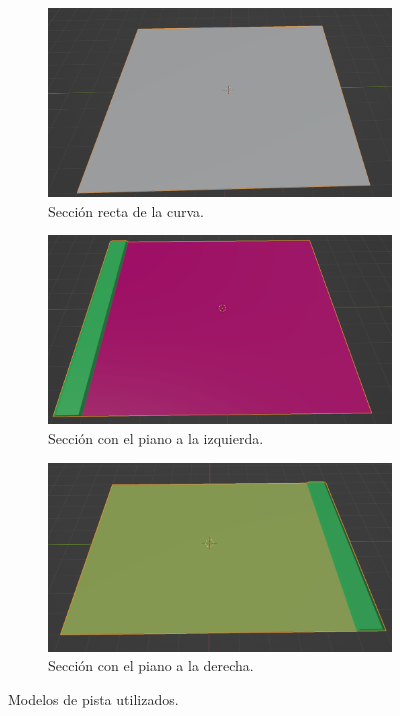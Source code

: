 \begin{figure}[H]
    \centering
    \begin{subfigure}[t]{0.48\textwidth}
        \centering
        \includegraphics[width=\textwidth]{imagenes/pista/curva-recta.png}
        \caption{Sección recta de la curva.}
        \label{fig:curvarecta}
    \end{subfigure}
    \hfill
    \begin{subfigure}[t]{0.48\textwidth}
        \centering
        \includegraphics[width=\textwidth]{imagenes/pista/curva.png}
        \caption{Sección con el piano a la izquierda.}
        \label{fig:curvaL}
    \end{subfigure}
    \par\bigskip
    \begin{subfigure}[t]{0.48\textwidth}
        \centering
        \includegraphics[width=\textwidth]{imagenes/pista/curva-inverted.png}
        \caption{Sección con el piano a la derecha.}
        \label{fig:curvaR}
    \end{subfigure}
    \caption{Modelos de pista utilizados.}
    \label{fig:curvasmodelos}
\end{figure}

